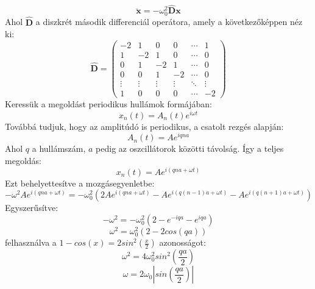 \documentclass[a4paper,12pt]{article}
\begin{document}
\begin{equation}
    \ddot{\mathbf{x}} = -\omega_0^2 \mathbf{\hat{D}x}
\end{equation}
Ahol $\mathbf{\hat{D}}$ a diszkrét második differenciál operátora, amely a következőképpen néz ki:
\begin{equation}
    \mathbf{\hat{D}} = \begin{pmatrix}
    - 2 & 1 & 0 & 0 & \cdots & 1 \\
    1 & -2 & 1 & 0 & \cdots & 0 \\
    0 & 1 & -2 & 1 & \cdots & 0 \\
    0 & 0 & 1 & -2 & \cdots & 0 \\
    \vdots & \vdots & \vdots & \vdots & \ddots & \vdots \\
    1 & 0 & 0 & 0 & \cdots & -2
    \end{pmatrix}
\end{equation}
Keressük a megoldást periodikus hullámok formájában:
\begin{equation}
    x_n(t) = A_n(t) e^{i\omega t}
\end{equation}
Továbbá tudjuk, hogy az amplitúdó is periodikus, a csatolt rezgés alapján:
\begin{equation}
    A_n(t) = A e^{i q n a}
\end{equation}
Ahol $q$ a hullámszám, $a$ pedig az oszcillátorok közötti távolság. Így a teljes megoldás:
\begin{equation}
    x_n(t) = A e^{i (q n a + \omega t)}
\end{equation}
Ezt behelyettesítve a mozgásegyenletbe:
\begin{equation}
    -\omega^2 A e^{i (q n a + \omega t)} = -\omega_0^2 \left( 2A e^{i (q n a + \omega t)} - A e^{i (q (n-1) a + \omega t)} - A e^{i (q (n+1) a + \omega t)} \right)
\end{equation}
Egyszerűsítve:
\begin{equation}
    -\omega^2 = -\omega_0^2 \left( 2 - e^{-i q a} - e^{i q a} \right)
\end{equation}
\begin{equation}
    \omega^2 = \omega_0^2 \left( 2 - 2 cos(q a) \right)
\end{equation}
felhasználva a $1 - cos(x) = 2 sin^2\left(\frac{x}{2}\right)$ azonosságot:
\begin{equation}
    \omega^2 = 4 \omega_0^2 sin^2\left(\frac{q a}{2}\right)
\end{equation}
\begin{equation}
    \omega = 2 \omega_0 \left| sin\left(\frac{q a}{2}\right) \right|
\end{equation}
\end{document}
